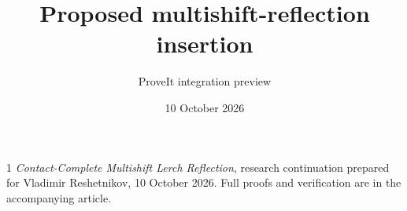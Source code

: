 \documentclass[11pt]{article}
\title{Proposed multishift-reflection insertion}\author{ProveIt integration preview}\date{10 October 2026}
\begin{document}
\maketitle
\begin{thebibliography}{1}
\emph{Contact-Complete Multishift Lerch Reflection}, research continuation prepared for Vladimir Reshetnikov, 10 October 2026. Full proofs and verification are in the accompanying article.
\end{thebibliography}
\end{document}
